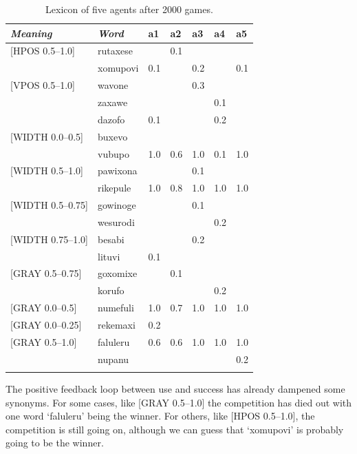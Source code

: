 \begin{table}
\begin{center}
\begin{tabular}{ l  l  l  l  l  l  l  }
\lsptoprule
{\itshape Meaning}&{\itshape Word}&{\bfshape  a1}&{\bfshape  a2}&{\bfshape  a3}&{\bfshape  a4}&{\bfshape  a5} \\ \midrule
{}[HPOS 0.5–1.0]&rutaxese& &0.1& & &\\ 
 & xomupovi&0.1& &0.2& &0.1\\ 
{}[VPOS 0.5–1.0]&wavone& & &0.3& &\\ 
 & zaxawe& & & &0.1& \\ 
 & dazofo&0.1& & &0.2&\\ 
{}[WIDTH 0.0–0.5]&buxevo& & & & & \\ 
 & vubupo&1.0&0.6&1.0&0.1&1.0\\ 
{}[WIDTH 0.5–1.0]&pawixona& & &0.1& & \\ 
 & rikepule&1.0&0.8&1.0&1.0&1.0\\ 
{}[WIDTH 0.5–0.75]&gowinoge& & &0.1& &  \\ 
 & wesurodi& & & &0.2&\\ 
{}[WIDTH 0.75–1.0]&besabi& & &0.2& & \\ 
 & lituvi&0.1& & & & \\ 
{}[GRAY 0.5–0.75]&goxomixe& &0.1& & & \\ 
 & korufo& & & &0.2&\\ 
{}[GRAY 0.0–0.5]&numefuli&1.0&0.7&1.0&1.0&1.0\\ 
{}[GRAY 0.0–0.25]&rekemaxi&0.2& & & & \\ 
{}[GRAY 0.5–1.0]&faluleru&0.6&0.6&1.0&1.0&1.0\\ 
 & nupanu& & & & &0.2 \\ 
\lspbottomrule
\end{tabular}
\caption{\label{tab:lex2000}Lexicon of five agents after 2000 games.}
\end{center}
\end{table}

The positive feedback loop between use and success
has already dampened some synonyms. For some cases, like [GRAY 0.5–1.0] the competition has died out 
with one word `faluleru' being the winner. 
For others, like [HPOS 0.5–1.0], the competition 
is still going on, although we can guess
that `xomupovi' is probably going to be the winner. 

